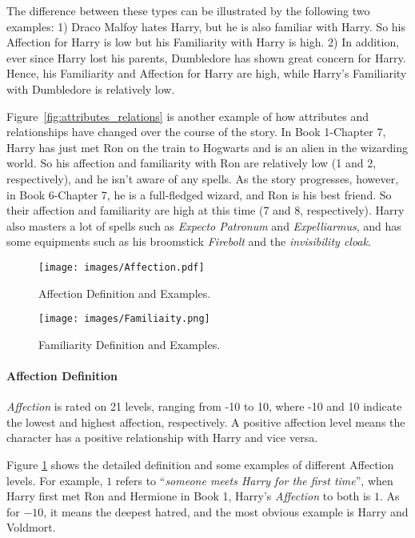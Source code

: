 \documentclass[11pt]{article}
\begin{document}
The difference between these types can be illustrated by the following two examples: 1) Draco Malfoy hates Harry, but he is also familiar with Harry. So his Affection for Harry is low but his Familiarity with Harry is high. 2) In addition, ever since Harry lost his parents, Dumbledore has shown great concern for Harry. Hence, his Familiarity and Affection for Harry are high, while Harry's Familiarity with Dumbledore is relatively low. 

Figure~\ref{fig:attributes_relations} is another example of how attributes and relationships have changed over the course of the story. In Book 1-Chapter 7, Harry has just met Ron on the train to Hogwarts and is an alien in the wizarding world. So his affection and familiarity with Ron are relatively low (1 and 2, respectively), and he isn't aware of any spells. As the story progresses, however, in Book 6-Chapter 7, he is a full-fledged wizard, and Ron is his best friend. So their affection and familiarity are high at this time (7 and 8, respectively). Harry also masters a lot of spells such as \textit{Expecto Patronum} and \textit{Expelliarmus}, and has some equipments such as his broomstick \textit{Firebolt} and the \textit{invisibility cloak}.



\begin{figure}
    \centering
    \texttt{[image: images/Affection.pdf]}
    \caption{Affection Definition and Examples.}
    \label{fig:affection_}
\end{figure}
\begin{figure}
    \centering
    \texttt{[image: images/Familiaity.png]}
       \caption{Familiarity Definition and Examples.}
\label{fig:familiarity_}
\end{figure}




\paragraph{Affection Definition}


\textit{Affection} is rated on 21 levels, ranging from -10 to 10, where -10 and 10 indicate the lowest and highest affection, respectively. 
A positive affection level means the character has a positive relationship with Harry and vice versa. 

Figure \ref{fig:affection_} shows the detailed definition and some examples 
of different Affection levels. For example, $1$ refers to ``\textit{someone meets Harry for the first time}'', when Harry first met Ron and Hermione in Book 1, Harry's \textit{Affection} to both is $1$. As for $-10$, it means the deepest hatred, and the most obvious example is Harry and Voldmort. 
\end{document}
